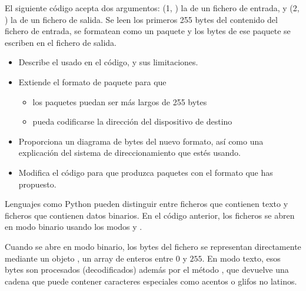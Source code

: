 \begin{exercise}
El siguiente código acepta dos argumentos: (1, ) la  de un fichero de entrada, 
y (2, ) la  de un fichero de salida.
Se leen los primeros 255 bytes del contenido del fichero de entrada, 
se formatean como un paquete y los bytes de ese paquete
se escriben en el fichero de salida.

\begin{center}
\end{center}

\begin{itemize}
\item Describe el  usado en el código, y sus limitaciones.

\item Extiende el formato de paquete para que 
 \begin{itemize}
   \item los paquetes puedan ser más largos de 255 bytes
   \item pueda codificarse la dirección del dispositivo de destino
  \end{itemize}
  
\item Proporciona un diagrama de bytes del nuevo formato, 
así como una explicación del sistema de direccionamiento que estés usando.

\item Modifica el código para que produzca paquetes con el formato que has propuesto.
\end{itemize}
\end{exercise}

\begin{remark}
Lenguajes como Python pueden distinguir entre ficheros que contienen texto y ficheros que contienen datos binarios.
En el código anterior, los ficheros se abren en modo binario usando los modos  y .

Cuando se abre en modo binario, los bytes del fichero se representan directamente mediante un objeto , un array de 
enteros entre $0$ y $255$. En modo texto, esos bytes son procesados (decodificados) además por el método ,
que devuelve una cadena que puede contener caracteres especiales como acentos o glifos no latinos. 
\end{remark}

